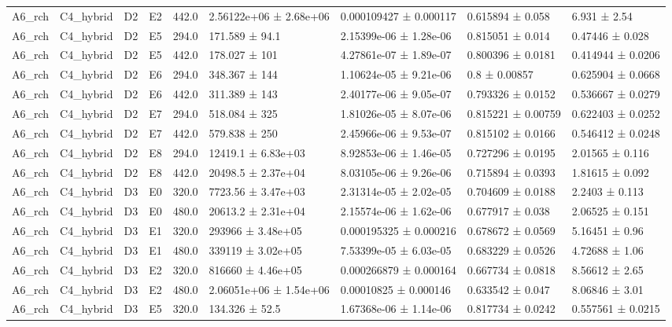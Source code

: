 \begin{table}
\begin{tabular}{lllllllll}
A6\_rch & C4\_hybrid & D2 & E2 & 442.0 & 2.56122e+06 ± 2.68e+06 & 0.000109427 ± 0.000117 & 0.615894 ± 0.058 & 6.931 ± 2.54 \\
A6\_rch & C4\_hybrid & D2 & E5 & 294.0 & 171.589 ± 94.1 & 2.15399e-06 ± 1.28e-06 & 0.815051 ± 0.014 & 0.47446 ± 0.028 \\
A6\_rch & C4\_hybrid & D2 & E5 & 442.0 & 178.027 ± 101 & 4.27861e-07 ± 1.89e-07 & 0.800396 ± 0.0181 & 0.414944 ± 0.0206 \\
A6\_rch & C4\_hybrid & D2 & E6 & 294.0 & 348.367 ± 144 & 1.10624e-05 ± 9.21e-06 & 0.8 ± 0.00857 & 0.625904 ± 0.0668 \\
A6\_rch & C4\_hybrid & D2 & E6 & 442.0 & 311.389 ± 143 & 2.40177e-06 ± 9.05e-07 & 0.793326 ± 0.0152 & 0.536667 ± 0.0279 \\
A6\_rch & C4\_hybrid & D2 & E7 & 294.0 & 518.084 ± 325 & 1.81026e-05 ± 8.07e-06 & 0.815221 ± 0.00759 & 0.622403 ± 0.0252 \\
A6\_rch & C4\_hybrid & D2 & E7 & 442.0 & 579.838 ± 250 & 2.45966e-06 ± 9.53e-07 & 0.815102 ± 0.0166 & 0.546412 ± 0.0248 \\
A6\_rch & C4\_hybrid & D2 & E8 & 294.0 & 12419.1 ± 6.83e+03 & 8.92853e-06 ± 1.46e-05 & 0.727296 ± 0.0195 & 2.01565 ± 0.116 \\
A6\_rch & C4\_hybrid & D2 & E8 & 442.0 & 20498.5 ± 2.37e+04 & 8.03105e-06 ± 9.26e-06 & 0.715894 ± 0.0393 & 1.81615 ± 0.092 \\
A6\_rch & C4\_hybrid & D3 & E0 & 320.0 & 7723.56 ± 3.47e+03 & 2.31314e-05 ± 2.02e-05 & 0.704609 ± 0.0188 & 2.2403 ± 0.113 \\
A6\_rch & C4\_hybrid & D3 & E0 & 480.0 & 20613.2 ± 2.31e+04 & 2.15574e-06 ± 1.62e-06 & 0.677917 ± 0.038 & 2.06525 ± 0.151 \\
A6\_rch & C4\_hybrid & D3 & E1 & 320.0 & 293966 ± 3.48e+05 & 0.000195325 ± 0.000216 & 0.678672 ± 0.0569 & 5.16451 ± 0.96 \\
A6\_rch & C4\_hybrid & D3 & E1 & 480.0 & 339119 ± 3.02e+05 & 7.53399e-05 ± 6.03e-05 & 0.683229 ± 0.0526 & 4.72688 ± 1.06 \\
A6\_rch & C4\_hybrid & D3 & E2 & 320.0 & 816660 ± 4.46e+05 & 0.000266879 ± 0.000164 & 0.667734 ± 0.0818 & 8.56612 ± 2.65 \\
A6\_rch & C4\_hybrid & D3 & E2 & 480.0 & 2.06051e+06 ± 1.54e+06 & 0.00010825 ± 0.000146 & 0.633542 ± 0.047 & 8.06846 ± 3.01 \\
A6\_rch & C4\_hybrid & D3 & E5 & 320.0 & 134.326 ± 52.5 & 1.67368e-06 ± 1.14e-06 & 0.817734 ± 0.0242 & 0.557561 ± 0.0215 \\

\end{tabular}
\end{table}
